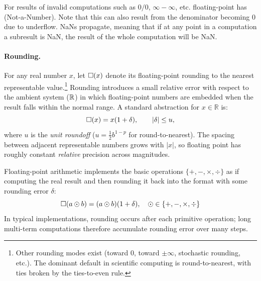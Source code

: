 \documentclass{article}
\begin{document}
For results of invalid computations such as $0/0$, $\infty - \infty$, etc. floating-point has  (Not-a-Number). Note that this can also result from the denominator becoming 0 due to underflow.
NaNs propagate, meaning that if at any point in a computation a subresult is NaN, the result of the whole computation will be NaN.

\paragraph{Rounding.}
For any real number $x$, let $\square(x)$ denote its floating-point rounding to the nearest representable value.\footnote{Other rounding modes exist (toward $0$, toward $\pm\infty$, stochastic rounding, etc.). The dominant default in scientific computing is round-to-nearest, with ties broken by the ties-to-even rule.}
Rounding introduces a small relative error with respect to the ambient system ($\mathbb{R}$) in which floating-point numbers are embedded when the result falls within the normal range. A standard abstraction for $x \in \mathbb{R}$ is:
$$
\square(x) = x(1+\delta), \qquad |\delta| \le u,
$$
where $u$ is the \emph{unit roundoff} ($u = \frac{1}{2}b^{1-p}$ for round-to-nearest). The spacing between adjacent representable numbers grows with $|x|$, so floating point has roughly constant \emph{relative} precision across magnitudes.

Floating-point arithmetic implements the basic operations $\{+, -, \times, \div\}$ as if computing the real result and then rounding it back into the format with some rounding error $\delta$:
$$
\square(a \odot b) = (a \odot b)(1+\delta), \quad \odot \in \{+, -, \times, \div\}
$$
In typical implementations, rounding occurs after each primitive operation; long multi-term computations therefore accumulate rounding error over many steps.
\end{document}
